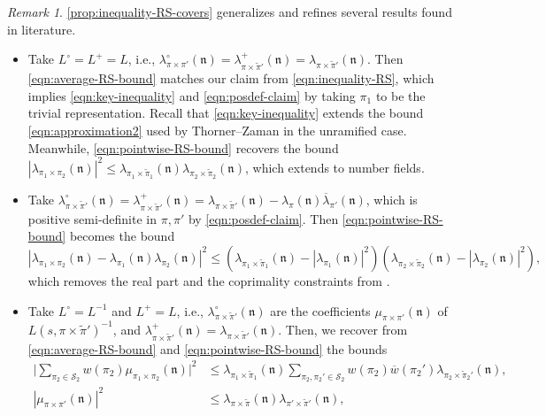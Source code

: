 \documentclass[11pt]{amsart}
\theoremstyle{remark}
\newtheorem*{remark}{Remark}
\numberwithin{equation}{section}
\newcommand{\n}{\mathfrak{n}}
\newcommand{\kn}{\mathfrak{n}}
\newcommand{\mS}{\mathcal{S}}
\renewcommand{\bar}{\overline}
\renewcommand{\tilde}{\widetilde}
\begin{document}
\begin{remark}
\cref{prop:inequality-RS-covers} generalizes and refines several results found in literature.
\begin{itemize}
\item[(1).]
Take $L^\circ = L^+ = L$, i.e., $\lambda^\circ_{\pi \times \pi'}(\n) = \lambda^+_{\pi \times \tilde\pi'}(\n) = \lambda_{\pi \times \tilde\pi'}(\n)$. Then \eqref{eqn:average-RS-bound} matches our claim from \eqref{eqn:inequality-RS}, which implies \eqref{eqn:key-inequality} and \eqref{eqn:posdef-claim} by taking $\pi_1$ to be the trivial representation.  Recall that \eqref{eqn:key-inequality} extends the bound \eqref{eqn:approximation2} used by Thorner--Zaman \cite{TZ_GLn} in the unramified case. Meanwhile, \eqref{eqn:pointwise-RS-bound} recovers the bound $|\lambda_{\pi_1\times\pi_2}(\kn)|^2\leq \lambda_{\pi_1\times\tilde{\pi}_1}(\kn)\lambda_{\pi_2\times\tilde{\pi}_2}(\kn)$, which extends \cite[Lemma 3.1]{JLW} to number fields.
\item[(2).] Take $\lambda^\circ_{\pi \times \tilde\pi'}(\n) = \lambda^+_{\pi \times \tilde\pi'}(\n) = \lambda_{\pi \times \tilde\pi'}(\n) - \lambda_\pi(\n) \bar\lambda_{\pi'}(\n)$, which is positive semi-definite in $\pi, \pi'$ by \eqref{eqn:posdef-claim}. Then \eqref{eqn:pointwise-RS-bound} becomes the bound
\[
    |\lambda_{\pi_1 \times \pi_2}(\n) - \lambda_{\pi_1}(\n) \lambda_{\pi_2}(\n)|^2 \le (\lambda_{\pi_1 \times \tilde\pi_1}(\n) - |\lambda_{\pi_1}(\n)|^2) (\lambda_{\pi_2 \times \tilde\pi_2}(\n) - |\lambda_{\pi_2}(\n)|^2),
\]
which removes the real part and the coprimality constraints from \cite[Proposition 3.1]{TZ_GLn}.
\item[(3).] Take $L^\circ = L^{-1}$ and $L^+ = L$, i.e., $\lambda^\circ_{\pi \times \tilde\pi'}(\n)$ are the coefficients $\mu_{\pi\times\pi'}(\kn)$ of $L(s, \pi \times \tilde\pi')^{-1}$, and $\lambda^+_{\pi \times \tilde\pi'}(\n) = \lambda_{\pi \times \tilde\pi'}(\n)$.  Then, we recover from \eqref{eqn:average-RS-bound} and \eqref{eqn:pointwise-RS-bound} the bounds
\begin{equation}
\label{eqn:mu_bound}
\begin{aligned}
 \Bigg| \sum_{\pi_2 \in \mS_2} w(\pi_2) \mu_{\pi_1 
    \times \pi_2}(\n) \Bigg|^2 &\le \lambda_{\pi_1 \times \tilde\pi_1}(\n) \sum_{\pi_2, \pi_2' \in \mS_2} w(\pi_2) \bar w(\pi_2') \lambda_{\pi_2 \times \tilde\pi_2'}(\n),\\
    |\mu_{\pi\times\pi'}(\kn)|^2&\leq \lambda_{\pi\times\tilde{\pi}}(\kn)\lambda_{\pi'\times\tilde{\pi}'}(\kn),
\end{aligned}

\end{equation}
\end{itemize}
\end{remark}
\end{document}
